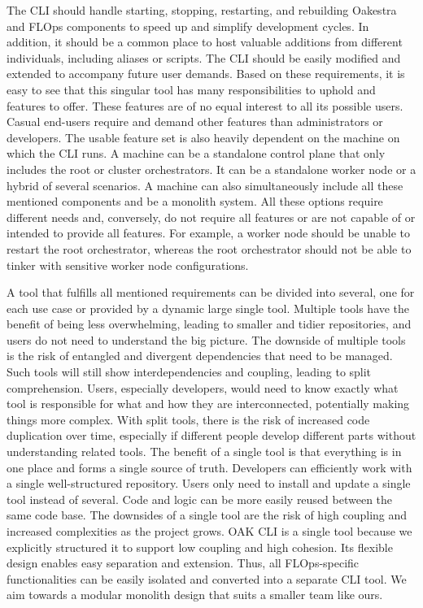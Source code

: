 The CLI should handle starting, stopping, restarting, and rebuilding Oakestra and FLOps components to speed up and simplify development cycles.
In addition, it should be a common place to host valuable additions from different individuals, including aliases or scripts.
The CLI should be easily modified and extended to accompany future user demands.
\vspace{5mm}
\newline
Based on these requirements, it is easy to see that this singular tool has many responsibilities to uphold and features to offer.
These features are of no equal interest to all its possible users.
Casual end-users require and demand other features than administrators or developers.
The usable feature set is also heavily dependent on the machine on which the CLI runs.
A machine can be a standalone control plane that only includes the root or cluster orchestrators.
It can be a standalone worker node or a hybrid of several scenarios.
A machine can also simultaneously include all these mentioned components and be a monolith system.
All these options require different needs and, conversely, do not require all features or are not capable of or intended to provide all features.
For example, a worker node should be unable to restart the root orchestrator, whereas the root orchestrator should not be able to tinker with sensitive worker node configurations.

A tool that fulfills all mentioned requirements can be divided into several, one for each use case or provided by a dynamic large single tool.
Multiple tools have the benefit of being less overwhelming, leading to smaller and tidier repositories, and users do not need to understand the big picture.
The downside of multiple tools is the risk of entangled and divergent dependencies that need to be managed.
Such tools will still show interdependencies and coupling, leading to split comprehension.
Users, especially developers, would need to know exactly what tool is responsible for what and how they are interconnected, potentially making things more complex.
With split tools, there is the risk of increased code duplication over time, especially if different people develop different parts without understanding related tools.
The benefit of a single tool is that everything is in one place and forms a single source of truth.
Developers can efficiently work with a single well-structured repository.
Users only need to install and update a single tool instead of several.
Code and logic can be more easily reused between the same code base.
The downsides of a single tool are the risk of high coupling and increased complexities as the project grows.
OAK CLI is a single tool because we explicitly structured it to support low coupling and high cohesion.
Its flexible design enables easy separation and extension.
Thus, all FLOps-specific functionalities can be easily isolated and converted into a separate CLI tool.
We aim towards a modular monolith design that suits a smaller team like ours.
